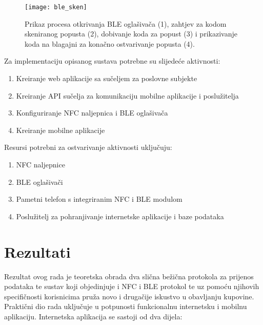 \begin{figure}[!htbp]
	\begin{center}
 \texttt{[image: ble\_sken]}
 \caption{Prikaz procesa otkrivanja BLE ogla\v{s}iva\v{c}a (1), zahtjev za kodom skeniranog popusta (2), dobivanje koda za popust (3) i prikazivanje koda na blagajni za kona\v{c}no ostvarivanje popusta (4).}
 \label{fig:otkrivanjeBLEa}
	\end{center}
\end{figure}

Za implementaciju opisanog sustava potrebne su slijede\'{c}e aktivnosti:
\begin{enumerate}
	\item Kreiranje web aplikacije sa su\v{c}eljem za poslovne subjekte
	\item Kreiranje API su\v{c}elja za komunikaciju mobilne aplikacije i poslu\v{z}itelja
	\item Konfiguriranje NFC naljepnica i BLE ogla\v{s}iva\v{c}a
	\item Kreiranje mobilne aplikacije
	
\end{enumerate}

Resursi potrebni za ostvarivanje aktivnosti uklju\v{c}uju:
\begin{enumerate}
	\item NFC naljepnice
	\item BLE ogla\v{s}iva\v{c}i
	\item Pametni telefon s integriranim NFC i BLE modulom
	\item Poslu\v{z}itelj za pohranjivanje internetske aplikacije i baze podataka
\end{enumerate}


\section{Rezultati}

Rezultat ovog rada je teoretska obrada dva sli\v{c}na be\v{z}i\v{c}na protokola za prijenos podataka te sustav koji objedinjuje i NFC i BLE protokol te uz pomo\'{c}u njihovih specifi\v{c}nosti korisnicima pru\v{z}a novo i druga\v{c}ije iskustvo u obavljanju kupovine. Prakti\v{c}ni dio rada uklju\v{c}uje u potpunosti funkcionalnu internetsku i mobilnu aplikaciju. Internetska aplikacija se sastoji od dva dijela:

